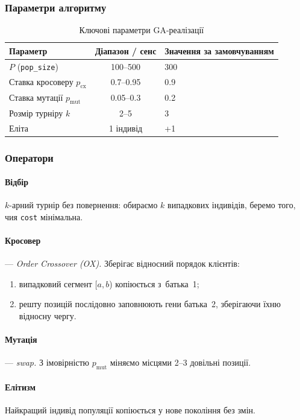 \documentclass[12pt,a4paper]{article}
\begin{document}
\subsubsection{Параметри алгоритму}
\begin{table}[h]
\centering
\begin{tabular}{lcl}
\toprule
Параметр & Діапазон / сенс & Значення за замовчуванням \\
\midrule
$P$ (\texttt{pop\_size})  & 100–500  & 300 \\
Ставка кросоверу $p_\text{cx}$ & 0.7–0.95 & 0.9 \\
Ставка мутації  $p_\text{mut}$ & 0.05–0.3 & 0.2 \\
Розмір турніру $k$            & 2–5 & 3 \\
Еліта                         & 1 індивід & +1 \\
\bottomrule
\end{tabular}
\caption{Ключові параметри GA-реалізації}
\end{table}

\subsubsection{Оператори}
\paragraph{Відбір}  
$k$-арний турнір без повернення:  
обираємо $k$ випадкових індивідів,  
беремо того, чия \texttt{cost} мінімальна.

\paragraph{Кросовер} — \emph{Order Crossover (OX).}  
Зберігає відносний порядок клієнтів:
\begin{enumerate}
  \item випадковий сегмент [\(a,b\)) копіюється з~батька~1;
  \item решту позицій послідовно заповнюють гени батька~2,
        зберігаючи їхню відносну чергу.
\end{enumerate}

\paragraph{Мутація} — \emph{swap.}  
З імовірністю $p_\text{mut}$ міняємо місцями 2–3 довільні позиції.

\paragraph{Елітизм}  
Найкращий індивід популяції копіюється у нове покоління без змін.
\end{document}
